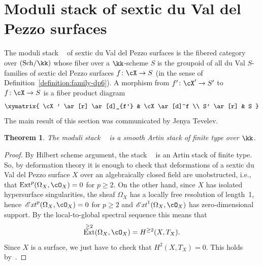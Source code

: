 \documentclass[11pt]{amsart}
\DeclareMathOperator{\Ext}{\mathrm{Ext}}
\DeclareMathOperator{\CExt}{\mathscr{E}\mathit{xt}}
\DeclareMathOperator{\DP}{{\mathfrak{DP}_6}}
\theoremstyle{plain}
\newtheorem{theorem}{Theorem}[section]
\theoremstyle{definition}
\theoremstyle{remark}
\begin{document}
\section{Moduli stack of sextic du Val del Pezzo surfaces}\label{appendix:moduli-stack}

The moduli stack $\DP$ of sextic du Val del Pezzo surfaces is the fibered category over $(\mathrm{Sch}/\kk)$ whose fiber over a $\kk$-scheme $S$ is 
the groupoid of all du Val $S$-families of sextic del Pezzo surfaces $f \colon \cX \to S$ (in the sense of Definition~\ref{definition:family-dp6}).
A morphism from $f' \colon \cX' \to S'$ to $f \colon \cX \to S$ is a fiber product diagram
\begin{equation*}
\xymatrix{
\cX' \ar[r] \ar[d]_{f'} & \cX \ar[d]^f \\ S' \ar[r] & S
}
\end{equation*}
The main result of this section was communicated by Jenya Tevelev.

\begin{theorem}\label{theorem:moduli-stack-dp6}
The moduli stack $\DP$ is a smooth Artin stack of finite type over $\kk$.
\end{theorem}
\begin{proof}
By Hilbert scheme argument, the stack $\DP$ is an Artin stack of finite type.
So, by deformation theory it is enough to check that deformations of a sextic du Val del Pezzo surface $X$ over an algebraically closed field are unobstructed, i.e., that $\Ext^p(\Omega_X,\cO_X) = 0$ for $p \ge 2$.
On the other hand, since $X$ has isolated hypersurface singularities, 
the sheaf $\Omega_X$ has a locally free resolution of length~1, 
hence~$\CExt^p(\Omega_X,\cO_X) = 0$ for $p \ge 2$ and $\CExt^1(\Omega_X,\cO_X)$ has zero-dimensional support.
By the local-to-global spectral sequence this means that 
\begin{equation*}
\Ext^{\ge 2}(\Omega_X,\cO_X) = H^{\ge 2}(X,T_X).
\end{equation*}
Since $X$ is a surface, we just have to check that $H^2(X,T_X) = 0$.
This holds by~\cite[Proposition~3.1]{hacking2010smoothable}.
\end{proof}
\end{document}
